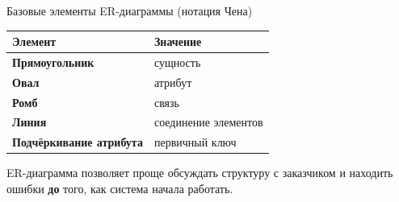 \documentclass[aspectratio=169]{beamer}
\begin{document}
\begin{frame}{Базовые элементы ER-диаграммы (нотация Чена)}

\begin{table}
\centering
\begin{tabular}{>{\bfseries}p{}|p{}}
\toprule
Элемент & Значение\\
\midrule
Прямоугольник & сущность\\
Овал & атрибут\\
Ромб & связь\\
Линия & соединение элементов\\
Подчёркивание атрибута & первичный ключ\\
\bottomrule
\end{tabular}
\end{table}

\vspace{0.4cm}

ER-диаграмма позволяет проще обсуждать структуру
с заказчиком и находить ошибки \textbf{до} того,
как система начала работать.

\end{frame}
\end{document}
